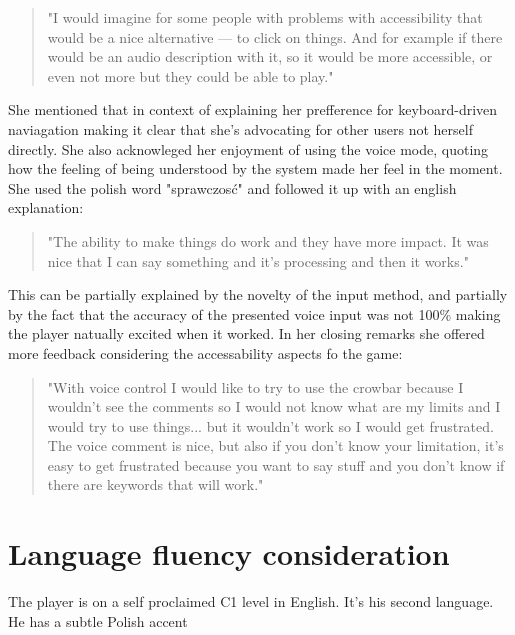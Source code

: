 \begin{quote}
    "I would imagine for some people with problems with accessibility that would be a nice alternative — to click on things. And for example if there would be an audio description with it, so it would be more accessible, or even not more but they could be able to play."
\end{quote}

She mentioned that in context of explaining her prefference for keyboard-driven naviagation making it clear that she's advocating for other users not herself directly. She also acknowleged her enjoyment of using the voice mode, quoting how the feeling of being understood by the system made her feel in the moment. She used the polish word "sprawczosć" and followed it up with an english explanation:

\begin{quote}
    "The ability to make things do work and they have more impact. It was nice that I can say something and it's processing and then it works."
\end{quote}

This can be partially explained by the novelty of the input method, and partially by the fact that the accuracy of the presented voice input was not 100\% making the player natually excited when it worked. 
In her closing remarks she offered more feedback considering the accessability aspects fo the game:

\begin{quote}
    "With voice control I would like to try to use the crowbar because I wouldn't see the comments so I would not know what are my limits and I would try to use things... but it wouldn't work so I would get frustrated. The voice comment is nice, but also if you don't know your limitation, it's easy to get frustrated because you want to say stuff and you don't know if there are keywords that will work."
\end{quote}


\section{Language fluency consideration}


The player is on a self proclaimed C1 level in English. It's his second language. He has a subtle Polish accent

